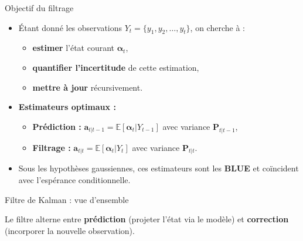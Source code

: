 \documentclass[11pt,aspectratio=169]{beamer}
\newcommand{\E}{\mathbb{E}}
\begin{document}
\begin{frame}{Objectif du filtrage}

\begin{itemize}

\item Étant donné les observations $Y_t = \{y_1, y_2, \ldots, y_t\}$, on cherche à :
  \begin{itemize}
  \item \textbf{estimer} l'état courant $\bm{\alpha}_t$,
  \item \textbf{quantifier l'incertitude} de cette estimation,
  \item \textbf{mettre à jour} récursivement.
  \end{itemize}

\item \textbf{Estimateurs optimaux :}
  \begin{itemize}
  \item \textbf{Prédiction :} $\bm{a}_{t|t-1} = \E[\bm{\alpha}_t | Y_{t-1}]$ avec variance $\bm{P}_{t|t-1}$,
  \item \textbf{Filtrage :} $\bm{a}_{t|t} = \E[\bm{\alpha}_t | Y_t]$ avec variance $\bm{P}_{t|t}$.
  \end{itemize}

\item Sous les hypothèses gaussiennes, ces estimateurs sont les \textbf{BLUE} et coïncident avec l'espérance conditionnelle.

\end{itemize}

\end{frame}

\begin{frame}{Filtre de Kalman : vue d'ensemble}

\begin{center}
\end{center}

Le filtre alterne entre \textbf{prédiction} (projeter l'état via le modèle) et \textbf{correction} (incorporer la nouvelle observation).

\end{frame}
\end{document}
